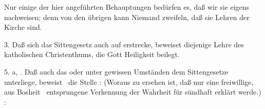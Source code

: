 Nur einige der hier angeführten Behauptungen bedürfen es, daß wir sie eigens nachweisen; denn von den übrigen kann Niemand zweifeln, daß sie Lehren der Kirche sind.
\begin{aufza}
\item[{\RWlat{ad} 3.}] Daß sich das Sittengesetz auch auf  erstrecke, beweiset diejenige Lehre des katholischen Christenthums, die Gott Heiligkeit beilegt.
\item[{\RWlat{ad} 5. a, \RWgriech{a}.}] Daß auch das  oder  unter gewissen Umständen dem Sittengesetze unterliege, beweist \zB\  die Stelle :  (Woraus zu ersehen ist, daß nur eine freiwillige, aus Bosheit \udgl\  entsprungene Verkennung der Wahrheit für sündhaft erklärt werde.) : 
\end{aufza}

